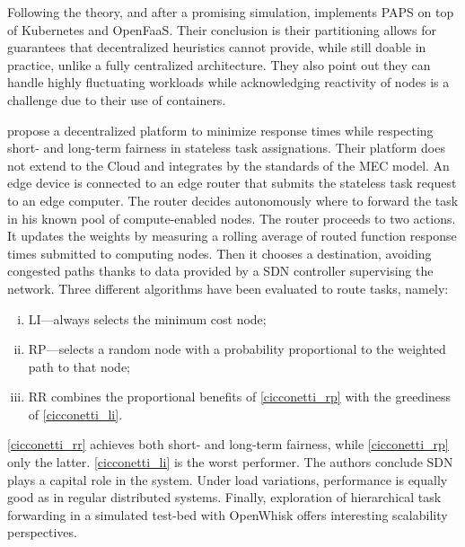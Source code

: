 \begin{description}[leftmargin=10pt]
		Following the theory, and after a promising simulation, \citet{baresi_paps_2021} implements \gls{PAPS} on top of Kubernetes and OpenFaaS. Their conclusion is their partitioning allows for guarantees that decentralized heuristics cannot provide, while still doable in practice, unlike a fully centralized architecture. They also point out they can handle highly fluctuating workloads while acknowledging reactivity of nodes is a challenge due to their use of containers.

	\item[\citet{cicconetti_decentralized_2021}] propose a decentralized platform to minimize response times while respecting short- and long-term fairness in stateless task assignations. Their platform does not extend to the Cloud and integrates by the standards of the \gls{MEC} model. An edge device is connected to an edge router that submits the stateless task request to an edge computer. The router decides autonomously where to forward the task in his known pool of compute-enabled nodes. The router proceeds to two actions. It updates the weights by measuring a rolling average of routed function response times submitted to computing nodes. Then it chooses a destination, avoiding congested paths thanks to data provided by a \gls{SDN} controller supervising the network. Three different algorithms have been evaluated to route tasks, namely:
		\begin{enumerate}[(i)]
			\item \label{cicconetti_li} \gls{LI}—always selects the minimum cost node;
			\item \label{cicconetti_rp} \gls{RP}—selects a random node with a probability proportional to the weighted path to that node;
			\item \label{cicconetti_rr} \gls{RR} combines the proportional benefits of \cref{cicconetti_rp} with the greediness of \cref{cicconetti_li}.
		\end{enumerate}
		\cref{cicconetti_rr} achieves both short- and long-term fairness, while \cref{cicconetti_rp} only the latter. \cref{cicconetti_li} is the worst performer.
		The authors conclude \gls{SDN} plays a capital role in the system. Under load variations, performance is equally good as in regular distributed systems. Finally, exploration of hierarchical task forwarding in a simulated test-bed with OpenWhisk offers interesting scalability perspectives.


\end{description}
